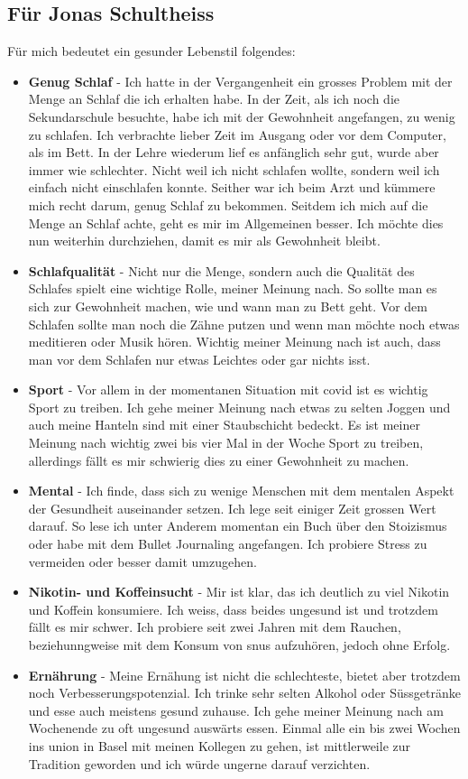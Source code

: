 \subsection{Für Jonas Schultheiss}
\authortoc{\jonas}{\subsectionident}
Für mich bedeutet ein gesunder Lebenstil folgendes:
\begin{itemize}
  \item \textbf{Genug Schlaf} - Ich hatte in der Vergangenheit ein grosses Problem mit der Menge an Schlaf die ich erhalten habe. In der Zeit, als ich noch die Sekundarschule besuchte, habe ich mit der Gewohnheit angefangen, zu wenig zu schlafen. Ich verbrachte lieber Zeit im Ausgang oder vor dem Computer, als im Bett. In der Lehre wiederum lief es anfänglich sehr gut, wurde aber immer wie schlechter. Nicht weil ich nicht schlafen wollte, sondern weil ich einfach nicht einschlafen konnte. Seither war ich beim Arzt und kümmere mich recht darum, genug Schlaf zu bekommen.
  \newline
  Seitdem ich mich auf die Menge an Schlaf achte, geht es mir im Allgemeinen besser. Ich möchte dies nun weiterhin durchziehen, damit es mir als Gewohnheit bleibt.
  \item \textbf{Schlafqualität} - Nicht nur die Menge, sondern auch die Qualität des Schlafes spielt eine wichtige Rolle, meiner Meinung nach. So sollte man es sich zur Gewohnheit machen, wie und wann man zu Bett geht. Vor dem Schlafen sollte man noch die Zähne putzen und wenn man möchte noch etwas meditieren oder Musik hören. Wichtig meiner Meinung nach ist auch, dass man vor dem Schlafen nur etwas Leichtes oder gar nichts isst.
  \item \textbf{Sport} - Vor allem in der momentanen Situation mit \acs{covid} ist es wichtig Sport zu treiben. Ich gehe meiner Meinung nach etwas zu selten Joggen und auch meine Hanteln sind mit einer Staubschicht bedeckt. Es ist meiner Meinung nach wichtig zwei bis vier Mal in der Woche Sport zu treiben, allerdings fällt es mir schwierig dies zu einer Gewohnheit zu machen.
  \item \textbf{Mental} - Ich finde, dass sich zu wenige Menschen mit dem mentalen Aspekt der Gesundheit auseinander setzen. Ich lege seit einiger Zeit grossen Wert darauf. So lese ich unter Anderem momentan ein Buch über den Stoizismus oder habe mit dem Bullet Journaling angefangen. Ich probiere Stress zu vermeiden oder besser damit umzugehen.
  \item \textbf{Nikotin- und Koffeinsucht} - Mir ist klar, das ich deutlich zu viel Nikotin und Koffein konsumiere. Ich weiss, dass beides ungesund ist und trotzdem fällt es mir schwer. Ich probiere seit zwei Jahren mit dem Rauchen, beziehunngweise mit dem Konsum von \acs{snus} aufzuhören, jedoch ohne Erfolg.
  \item \textbf{Ernährung} - Meine Ernähung ist nicht die schlechteste, bietet aber trotzdem noch Verbesserungspotenzial. Ich trinke sehr selten Alkohol oder Süssgetränke und esse auch meistens gesund zuhause. Ich gehe meiner Meinung nach am Wochenende zu oft ungesund auswärts essen. Einmal alle ein bis zwei Wochen ins \acs{union} in Basel mit meinen Kollegen zu gehen, ist mittlerweile zur Tradition geworden und ich würde ungerne darauf verzichten.
\end{itemize}